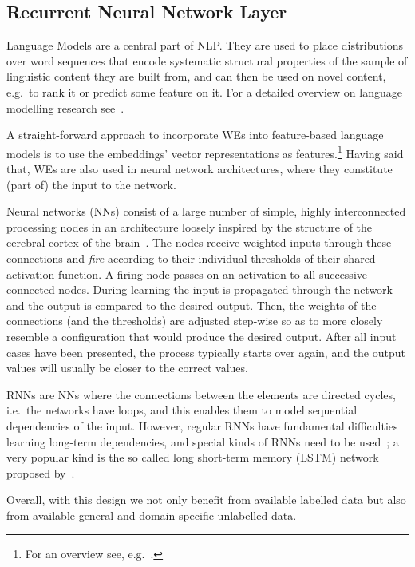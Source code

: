 \documentclass[11pt]{article}
\begin{document}
\subsection{Recurrent Neural Network Layer} %

Language Models are a central part of NLP.
They are used to place distributions over word sequences that encode systematic
structural properties of the sample of linguistic content they are built from,
and can then be used on novel content, e.g.~to rank it or predict some feature
on it. 
For a detailed overview on language modelling research see~.

A straight-forward approach to incorporate WEs into feature-based
language models is to use the embeddings' vector representations as
features.\footnote{For an overview see,
e.g.~.}
Having said that, WEs are also used in neural network architectures, where they
constitute (part of) the input to the network. 

Neural networks (NNs) consist of a large number of simple, highly interconnected
processing nodes in an architecture loosely inspired by the structure of the
cerebral cortex of the brain~\cite{oreilly2000}.
The nodes receive weighted inputs through these connections and \emph{fire}
according to their individual thresholds of their shared activation function.
A firing node passes on an activation to all successive connected nodes.
During learning the input is propagated through the network and the output is
compared to the desired output. 
Then, the weights of the connections (and the thresholds) are adjusted
step-wise so as to more closely resemble a configuration that would produce the
desired output.
After all input cases have been presented, the process typically starts over
again, and the output values will usually be closer to the correct values.

RNNs are NNs where the connections between the elements are directed cycles,
i.e.~the networks have loops, and this enables them to model sequential
dependencies of the input.
However, regular RNNs have fundamental difficulties learning long-term
dependencies, and special kinds of RNNs need to be used~\cite{Hochreiter1991}; 
a very popular kind is the so called long short-term memory (LSTM)
network proposed by~.

Overall, with this design we not only benefit from available labelled data but
also from available general and domain-specific unlabelled data.
\end{document}
